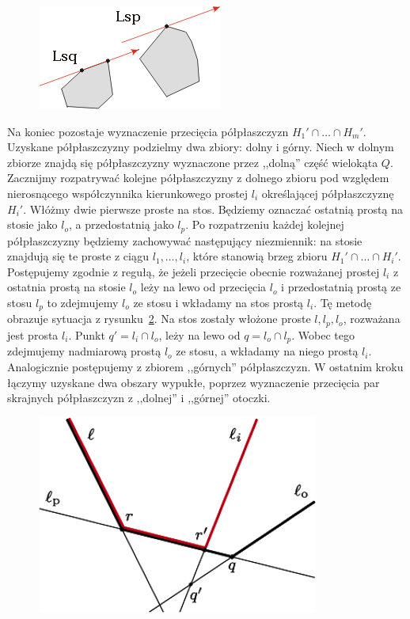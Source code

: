 \begin{figure}[htb]
  \centering
  \includegraphics[scale=1]{img/containment3}
  \caption{\label{img:containment3}}
\end{figure}

Na koniec pozostaje wyznaczenie przecięcia półpłaszczyzn $H_1' \cap
\ldots \cap H_m'$. Uzyskane półpłaszczyzny podzielmy dwa zbiory: dolny
i górny. Niech w dolnym zbiorze znajdą się półpłaszczyzny wyznaczone
przez ,,dolną'' część wielokąta $Q$. Zacznijmy rozpatrywać kolejne
półpłaszczyzny z dolnego zbioru pod względem nierosnącego
współczynnika kierunkowego prostej $l_i$ określającej półpłaszczyznę
$H_i'$. Włóżmy dwie pierwsze proste na stos. Będziemy oznaczać
ostatnią prostą na stosie jako $l_o$, a przedostatnią jako $l_p$. Po
rozpatrzeniu każdej kolejnej półpłaszczyzny będziemy zachowywać
następujący niezmiennik: na stosie znajdują się te proste z ciągu
$l_1, \ldots, l_i$, które stanowią brzeg zbioru $H_1' \cap \ldots \cap
H_i'$. Postępujemy zgodnie z regułą, że jeżeli przecięcie obecnie
rozważanej prostej $l_i$ z ostatnia prostą na stosie $l_o$ leży na
lewo od przecięcia $l_o$ i przedostatnią prostą ze stosu $l_p$ to
zdejmujemy $l_o$ ze stosu i wkładamy na stos prostą $l_i$. Tę metodę
obrazuje sytuacja z rysunku~\ref{img:containment2}. Na stos zostały
włożone proste $l, l_p, l_o$, rozważana jest prosta $l_i$. Punkt $q' =
l_i \cap l_o$, leży na lewo od $q = l_o \cap l_p$. Wobec tego
zdejmujemy nadmiarową prostą $l_o$ ze stosu, a wkładamy na niego
prostą $l_i$. Analogicznie postępujemy z zbiorem ,,górnych''
półpłaszczyzn. W ostatnim kroku łączymy uzyskane dwa obszary wypukłe,
poprzez wyznaczenie przecięcia par skrajnych półpłaszczyzn z
,,dolnej'' i ,,górnej'' otoczki.

\begin{figure}[htb]
  \centering
  \includegraphics[scale=0.6]{img/containment2}
  \caption{\label{img:containment2}}
\end{figure}

